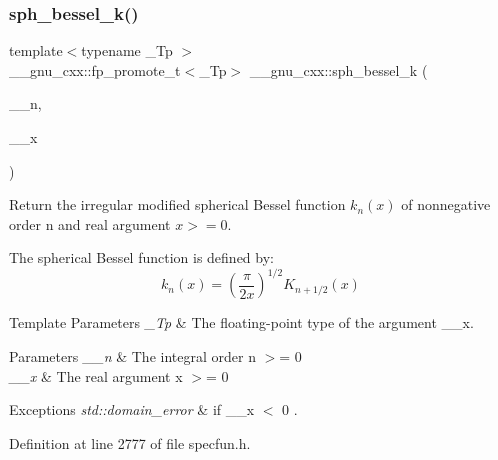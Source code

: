 \subsubsection{\texorpdfstring{sph\+\_\+bessel\+\_\+k()}{sph\_bessel\_k()}}
{\footnotesize\ttfamily template$<$typename \+\_\+\+Tp $>$ \\
\+\_\+\+\_\+gnu\+\_\+cxx\+::fp\+\_\+promote\+\_\+t$<$\+\_\+\+Tp$>$ \+\_\+\+\_\+gnu\+\_\+cxx\+::sph\+\_\+bessel\+\_\+k (\begin{DoxyParamCaption}\item[{unsigned int}]{\+\_\+\+\_\+n,  }\item[{\+\_\+\+Tp}]{\+\_\+\+\_\+x }\end{DoxyParamCaption})\hspace{0.3cm}{\ttfamily [inline]}}

Return the irregular modified spherical Bessel function $ k_n(x) $ of nonnegative order n and real argument $ x >= 0 $.

The spherical Bessel function is defined by\+: \[ k_n(x) = \left(\frac{\pi}{2x} \right) ^{1/2} K_{n+1/2}(x) \]


\begin{DoxyTemplParams}{Template Parameters}
{\em \+\_\+\+Tp} & The floating-\/point type of the argument {\ttfamily \+\_\+\+\_\+x}. \\
\hline
\end{DoxyTemplParams}

\begin{DoxyParams}{Parameters}
{\em \+\_\+\+\_\+n} & The integral order {\ttfamily  n $>$= 0 } \\
\hline
{\em \+\_\+\+\_\+x} & The real argument {\ttfamily  x $>$= 0 } \\
\hline
\end{DoxyParams}

\begin{DoxyExceptions}{Exceptions}
{\em std\+::domain\+\_\+error} & if {\ttfamily  \+\_\+\+\_\+x $<$ 0 }. \\
\hline
\end{DoxyExceptions}


Definition at line 2777 of file specfun.\+h.

\mbox{\label{group__gnu__math__spec__func_gaf886e8f8dfd2af0c4a9c5929d193d12f}} 
